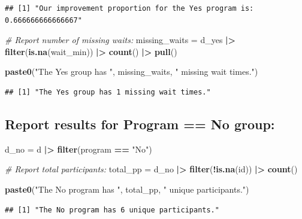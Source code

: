 \documentclass[
]{article}
\newenvironment{Shaded}{\begin{snugshade}}{\end{snugshade}}
\newcommand{\CommentTok}[1]{\textcolor[rgb]{0.56,0.35,0.01}{\textit{#1}}}
\newcommand{\FunctionTok}[1]{\textcolor[rgb]{0.13,0.29,0.53}{\textbf{#1}}}
\newcommand{\NormalTok}[1]{#1}
\newcommand{\OtherTok}[1]{\textcolor[rgb]{0.56,0.35,0.01}{#1}}
\newcommand{\SpecialCharTok}[1]{\textcolor[rgb]{0.81,0.36,0.00}{\textbf{#1}}}
\newcommand{\StringTok}[1]{\textcolor[rgb]{0.31,0.60,0.02}{#1}}
\begin{document}
\begin{verbatim}
## [1] "Our improvement proportion for the Yes program is: 0.666666666666667"
\end{verbatim}

\begin{Shaded}
\begin{Highlighting}[]
\CommentTok{\# Report number of missing waits:}
\NormalTok{missing\_waits }\OtherTok{=}\NormalTok{ d\_yes }\SpecialCharTok{|\textgreater{}} 
  \FunctionTok{filter}\NormalTok{(}\FunctionTok{is.na}\NormalTok{(wait\_min)) }\SpecialCharTok{|\textgreater{}} 
  \FunctionTok{count}\NormalTok{() }\SpecialCharTok{|\textgreater{}} 
  \FunctionTok{pull}\NormalTok{()}

\FunctionTok{paste0}\NormalTok{(}\StringTok{"The Yes group has "}\NormalTok{, missing\_waits, }\StringTok{" missing wait times."}\NormalTok{)}
\end{Highlighting}
\end{Shaded}

\begin{verbatim}
## [1] "The Yes group has 1 missing wait times."
\end{verbatim}

\subsection{Report results for Program == No
group:}\label{report-results-for-program-no-group}

\begin{Shaded}
\begin{Highlighting}[]
\NormalTok{d\_no }\OtherTok{=}\NormalTok{ d }\SpecialCharTok{|\textgreater{}} 
  \FunctionTok{filter}\NormalTok{(program }\SpecialCharTok{==} \StringTok{"No"}\NormalTok{)}

\CommentTok{\# Report total participants:}
\NormalTok{total\_pp }\OtherTok{=}\NormalTok{ d\_no }\SpecialCharTok{|\textgreater{}} 
  \FunctionTok{filter}\NormalTok{(}\SpecialCharTok{!}\FunctionTok{is.na}\NormalTok{(id)) }\SpecialCharTok{|\textgreater{}} 
  \FunctionTok{count}\NormalTok{()}

\FunctionTok{paste0}\NormalTok{(}\StringTok{"The No program has "}\NormalTok{, total\_pp, }\StringTok{" unique participants."}\NormalTok{)}
\end{Highlighting}
\end{Shaded}

\begin{verbatim}
## [1] "The No program has 6 unique participants."
\end{verbatim}
\end{document}
